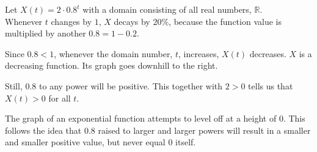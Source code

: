 \documentclass{ximera}
\begin{document}
\begin{example}

Let $X(t) = 2 \cdot 0.8^t$ with a domain consisting of all real numbers, $\mathbb{R}$. \\

Whenever $t$ changes by $1$, $X$ decays by $20\%$, because the function value is multiplied by another $0.8 = 1 - 0.2$.



Since $0.8 < 1$, whenever the domain number, $t$, increases, $X(t)$ decreases.  $X$ is a decreasing function.  Its graph goes downhill to the right.









\begin{image}
\end{image}




Still, $0.8$ to any power will be positive.  This together with $2>0$ tells us that $X(t) > 0$ for all $t$.


\end{example}

The graph of an exponential function attempts to level off at a height of $0$.  This follows the idea that $0.8$ raised to larger and larger powers will result in a smaller and smaller positive value, but never equal $0$ itself.
\end{document}
